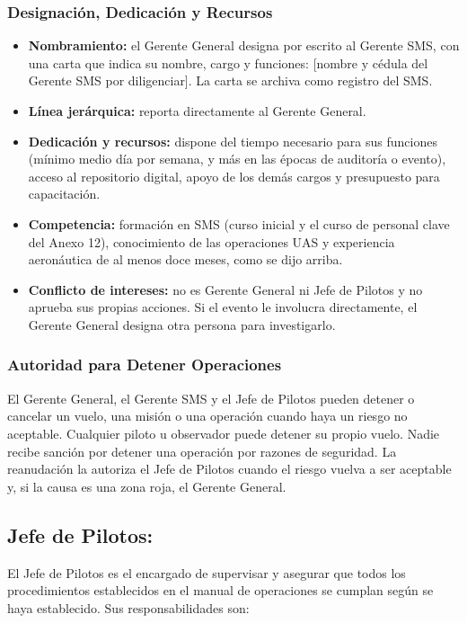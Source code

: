 \subsubsection{Designación, Dedicación y Recursos}
\begin{itemize}
    \item \textbf{Nombramiento:} el Gerente General designa por escrito al Gerente SMS, con una carta que indica su nombre, cargo y funciones: [nombre y cédula del Gerente SMS por diligenciar]. La carta se archiva como registro del SMS.
    \item \textbf{Línea jerárquica:} reporta directamente al Gerente General.
    \item \textbf{Dedicación y recursos:} dispone del tiempo necesario para sus funciones (mínimo medio día por semana, y más en las épocas de auditoría o evento), acceso al repositorio digital, apoyo de los demás cargos y presupuesto para capacitación.
    \item \textbf{Competencia:} formación en SMS (curso inicial y el curso de personal clave del Anexo 12), conocimiento de las operaciones UAS y experiencia aeronáutica de al menos doce meses, como se dijo arriba.
    \item \textbf{Conflicto de intereses:} no es Gerente General ni Jefe de Pilotos y no aprueba sus propias acciones. Si el evento le involucra directamente, el Gerente General designa otra persona para investigarlo.
\end{itemize}

\subsubsection{Autoridad para Detener Operaciones}
El Gerente General, el Gerente SMS y el Jefe de Pilotos pueden detener o cancelar un vuelo, una misión o una operación cuando haya un riesgo no aceptable. Cualquier piloto u observador puede detener su propio vuelo. Nadie recibe sanción por detener una operación por razones de seguridad. La reanudación la autoriza el Jefe de Pilotos cuando el riesgo vuelva a ser aceptable y, si la causa es una zona roja, el Gerente General.

\subsection{Jefe de Pilotos:} El Jefe de Pilotos es el encargado de supervisar y asegurar que todos los procedimientos establecidos en el manual de operaciones se cumplan según se haya establecido. Sus responsabilidades son:

